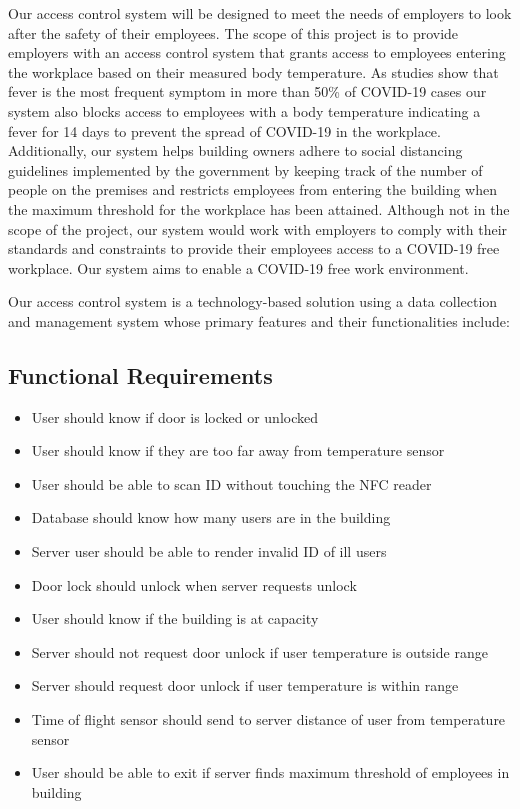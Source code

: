 Our access control system will be designed to meet the needs of employers to
look after the safety of their employees. The scope of this project is to
provide employers with an access control system that grants access to employees
entering the workplace based on their measured body temperature. As studies
show that fever is the most frequent symptom in more than 50\% of COVID-19
cases our system also blocks access to employees with a body temperature
indicating a fever for 14 days to prevent the spread of COVID-19 in the
workplace. Additionally, our system helps building owners adhere to social
distancing guidelines implemented by the government by keeping track of the
number of people on the premises and restricts employees from entering the
building when the maximum threshold for the workplace has been
attained. Although not in the scope of the project, our system would work with
employers to comply with their standards and constraints to provide their
employees access to a COVID-19 free workplace. Our system aims to enable a
COVID-19 free work environment.

Our access control system is a technology-based solution using a data collection
and management system whose primary features and their functionalities include:

\subsection{Functional Requirements}
\begin{itemize}
    \item User should know if door is locked or unlocked
    \item User should know if they are too far away from temperature sensor
    \item User should be able to scan ID without touching the NFC reader
    \item Database should know how many users are in the building
    \item Server user should be able to render invalid ID of ill users
    \item Door lock should unlock when server requests unlock
    \item User should know if the building is at capacity
    \item Server should not request door unlock if user temperature is outside range
    \item Server should request door unlock if user temperature is within range
    \item Time of flight sensor should send to server distance of user from temperature sensor
    \item User should be able to exit if server finds maximum threshold of employees in building
\end{itemize}

